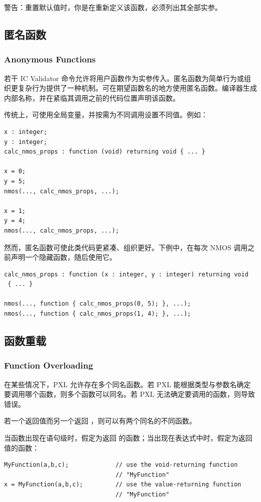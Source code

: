 \begin{noteBox}
警告：重置默认值时，你是在重新定义该函数，必须列出其全部实参。
\end{noteBox}

\subsection{匿名函数}
\subsubsection*{Anonymous Functions}

若干 IC Validator 命令允许将用户函数作为实参传入。匿名函数为简单行为或组织更复杂行为提供了一种机制。可在期望函数名的地方使用匿名函数。编译器生成内部名称，并在紧临其调用之前的代码位置声明该函数。

传统上，可使用全局变量，并按需为不同调用设置不同值。例如：
\begin{lstlisting}[style=pxl]
x : integer;
y : integer;
calc_nmos_props : function (void) returning void { ... }

x = 0;
y = 5;
nmos(..., calc_nmos_props, ...);

x = 1;
y = 4;
nmos(..., calc_nmos_props, ...);
\end{lstlisting}

然而，匿名函数可使此类代码更紧凑、组织更好。下例中，在每次 NMOS 调用之前声明一个隐藏函数，随后使用它。
\begin{lstlisting}[style=pxl]
calc_nmos_props : function (x : integer, y : integer) returning void
 { ... }

nmos(..., function { calc_nmos_props(0, 5); }, ...);
nmos(..., function { calc_nmos_props(1, 4); }, ...);
\end{lstlisting}

\subsection{函数重载}
\subsubsection*{Function Overloading}

在某些情况下，PXL 允许存在多个同名函数。若 PXL 能根据类型与参数名确定要调用哪个函数，则多个函数可以同名。若 PXL 无法确定要调用的函数，则导致错误。

若一个返回值而另一个返回 ，则可以有两个同名的不同函数。

当函数出现在语句级时，假定为返回  的函数；当出现在表达式中时，假定为返回值的函数：
\begin{lstlisting}[style=pxl]
MyFunction(a,b,c);             // use the void-returning function
                               // "MyFunction"
x = MyFunction(a,b,c);         // use the value-returning function
                               // "MyFunction"
\end{lstlisting}

